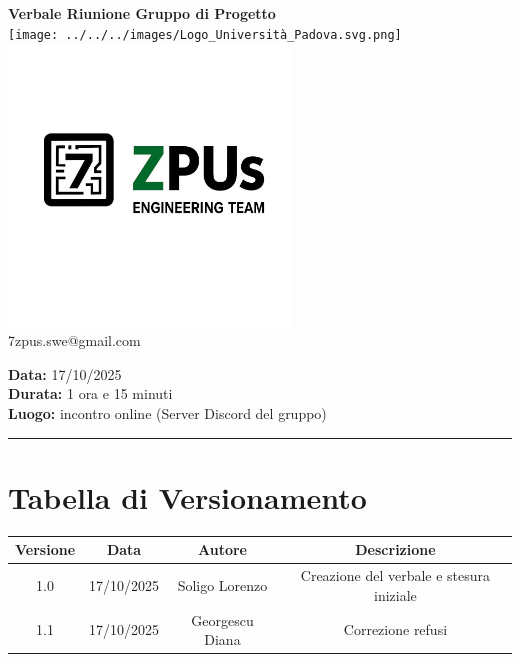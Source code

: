 \documentclass[a4paper,12pt]{article}
\begin{document}
\begin{center}
    \Large \textbf{Verbale Riunione Gruppo di Progetto}\\
    \vspace{0.5cm}
    \texttt{[image: ../../../images/Logo\_Università\_Padova.svg.png]}\\
    \includegraphics[width=7.5cm]{../../../images/logo7ZPUs2.jpeg}\\
    \small\hspace{10cm} 7zpus.swe@gmail.com
\end{center}

\noindent
\textbf{Data:} 17/10/2025 \\
\textbf{Durata:} 1 ora e 15 minuti \\
\textbf{Luogo:} incontro online (Server Discord del gruppo)

\vspace{0.3cm}
\hrule
\vspace{0.5cm}

\tableofcontents

\newpage

\section{Tabella di Versionamento}
    \begin{tabular}{|c|c|c|c|}
        \hline
        \textbf{Versione} & \textbf{Data} & \textbf{Autore} & \textbf{Descrizione} \\
        \hline
        1.0 & 17/10/2025 & Soligo Lorenzo & Creazione del verbale e stesura iniziale \\
        \hline
        1.1 & 17/10/2025 & Georgescu Diana & Correzione refusi \\
        \hline
    \end{tabular}
\end{document}
